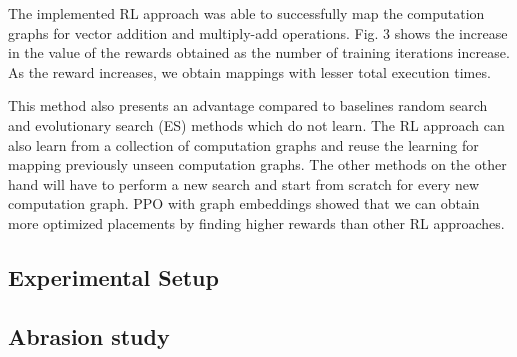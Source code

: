 The implemented RL approach was able to successfully map the computation graphs for vector addition and multiply-add operations. 
Fig. 3 shows the increase in the value of the rewards obtained as the number of training iterations increase. 
As the reward increases, we obtain mappings with lesser total execution times. 

This method also presents an advantage compared to baselines random search and evolutionary search (ES) methods which do not learn. 
The RL approach can also learn from a collection of computation graphs and reuse the learning for mapping previously unseen computation graphs. 
The other methods on the other hand will have to perform a new search and start from scratch for every new computation graph. 
PPO with graph embeddings showed that we can obtain more optimized placements by finding higher rewards than other RL approaches. 

\subsection{Experimental Setup}

\subsection{Abrasion study}